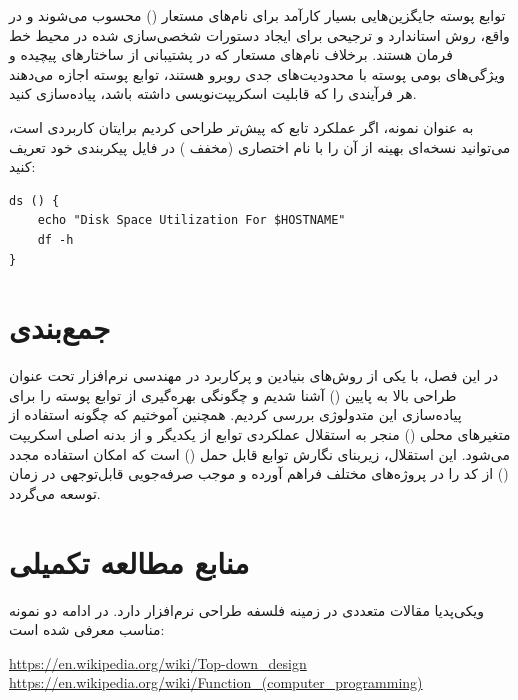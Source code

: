 توابع پوسته جایگزین‌هایی بسیار کارآمد برای نام‌های مستعار () محسوب می‌شوند و در واقع، روش استاندارد و ترجیحی برای ایجاد دستورات شخصی‌سازی شده در محیط خط فرمان هستند. برخلاف نام‌های مستعار که در پشتیبانی از ساختارهای پیچیده و ویژگی‌های بومی پوسته با محدودیت‌های جدی روبرو هستند، توابع پوسته اجازه می‌دهند هر فرآیندی را که قابلیت اسکریپت‌نویسی داشته باشد، پیاده‌سازی کنید.

به عنوان نمونه، اگر عملکرد تابع  که پیش‌تر طراحی کردیم برایتان کاربردی است، می‌توانید نسخه‌ای بهینه از آن را با نام اختصاری  (مخفف ) در فایل پیکربندی  خود تعریف کنید:

\begin{latin}
\begin{lstlisting}
ds () {
    echo "Disk Space Utilization For $HOSTNAME"
    df -h
}
\end{lstlisting}
\end{latin}

\section{جمع‌بندی}

در این فصل، با یکی از روش‌های بنیادین و پرکاربرد در مهندسی نرم‌افزار تحت عنوان طراحی بالا به پایین () آشنا شدیم و چگونگی بهره‌گیری از توابع پوسته را برای پیاده‌سازی این متدولوژی بررسی کردیم. همچنین آموختیم که چگونه استفاده از متغیرهای محلی () منجر به استقلال عملکردی توابع از یکدیگر و از بدنه اصلی اسکریپت می‌شود. این استقلال، زیربنای نگارش توابع قابل حمل () است که امکان استفاده مجدد () از کد را در پروژه‌های مختلف فراهم آورده و موجب صرفه‌جویی قابل‌توجهی در زمان توسعه می‌گردد.

\section{منابع مطالعه تکمیلی}

ویکی‌پدیا مقالات متعددی در زمینه فلسفه طراحی نرم‌افزار دارد. در ادامه دو نمونه مناسب معرفی شده است:

\begin{latin}
\url{https://en.wikipedia.org/wiki/Top-down_design}\\
\url{https://en.wikipedia.org/wiki/Function_(computer_programming)}
\end{latin}